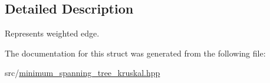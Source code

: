 \subsection{Detailed Description}
Represents weighted edge. 

The documentation for this struct was generated from the following file\-:\begin{DoxyCompactItemize}
\item 
src/\hyperlink{minimum__spanning__tree__kruskal_8hpp}{minimum\-\_\-spanning\-\_\-tree\-\_\-kruskal.\-hpp}\end{DoxyCompactItemize}
